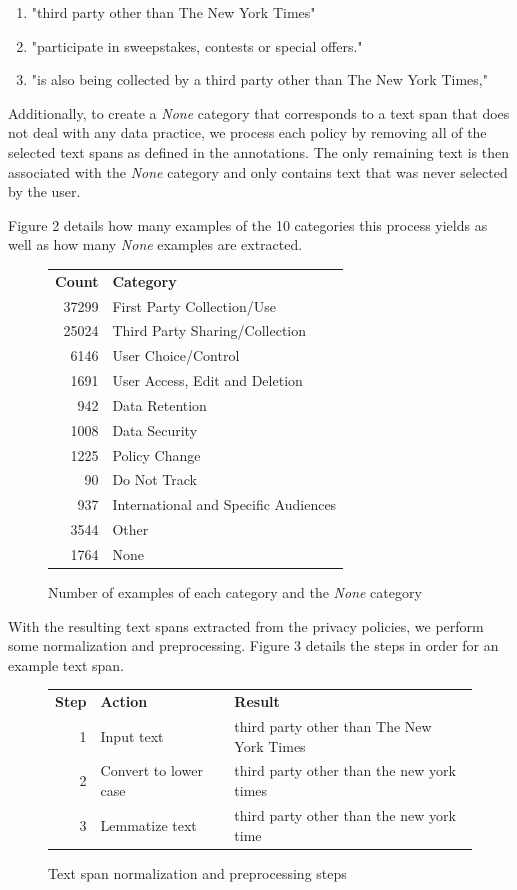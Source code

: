 \documentclass[12pt, letterpaper]{article}
\begin{document}
\begin{enumerate}
	\item "third party other than The New York Times"
	\item "participate in sweepstakes, contests or special offers."
	\item "is also being collected by a third party other than The New York Times,"
\end{enumerate}

Additionally, to create a \textit{None} category that corresponds to a text span that does not deal with any data practice, we process each policy by removing all of the selected text spans as defined in the annotations. The only remaining text is then associated with the \textit{None} category and only contains text that was never selected by the user.

Figure 2 details how many examples of the 10 categories this process yields as well as how many \textit{None} examples are extracted.

\begin{figure}[h]
	\begin{tabular}{rl}
		\textbf{Count} & \textbf{Category} \\
		37299 & First Party Collection/Use \\ 
		25024 & Third Party Sharing/Collection \\
		6146 & User Choice/Control \\
		1691 & User Access, Edit and Deletion \\
		942 & Data Retention \\
		1008 & Data Security \\
		1225 & Policy Change \\
		90 & Do Not Track \\
		937 & International and Specific Audiences \\
		3544 & Other \\
		1764 & None \\
	\end{tabular}
	\caption{Number of examples of each category and the \textit{None} category}
\end{figure}

With the resulting text spans extracted from the privacy policies, we perform some normalization and preprocessing. Figure 3 details the steps in order for an example text span.

\begin{figure}[h]
	\begin{tabular}{rll}
		\textbf{Step} & \textbf{Action} & \textbf{Result} \\
		1 & Input text & third party other than The New York Times \\ 
		2 & Convert to lower case & third party other than the new york times \\ 
		3 & Lemmatize text & third party other than the new york time \\
	\end{tabular}
\caption{Text span normalization and preprocessing steps}
\end{figure}
\end{document}
